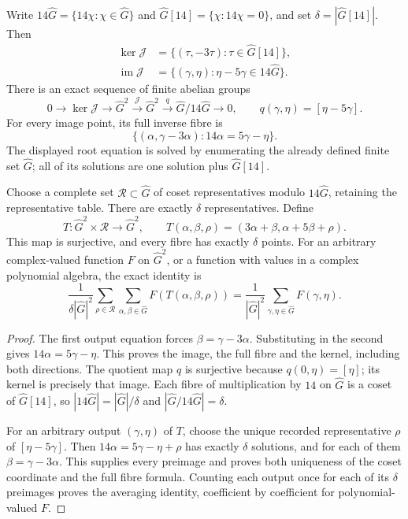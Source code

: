 \begin{theorem}
\label{thm:ns-character-coset-correction}
Write $14\widehat G=\{14\chi:\chi\in\widehat G\}$ and
$\widehat G[14]=\{\chi:14\chi=0\}$, and set
$\delta=|\widehat G[14]|$. Then
\[
 \begin{split}
 \ker\mathcal J&=\{(\tau,-3\tau):\tau\in\widehat G[14]\},\\
 \operatorname{im}\mathcal J
   &=\{(\gamma,\eta):\eta-5\gamma\in14\widehat G\}.
 \end{split}
\]
There is an exact sequence of finite abelian groups
\[
 0\longrightarrow\ker\mathcal J\longrightarrow\widehat G^2
   \xrightarrow{\mathcal J}\widehat G^2
   \xrightarrow{q}\widehat G/14\widehat G\longrightarrow0,
 \qquad q(\gamma,\eta)=[\eta-5\gamma].
\]
For every image point, its full inverse fibre is
\[
 \{(\alpha,\gamma-3\alpha):14\alpha=5\gamma-\eta\}.
\]
The displayed root equation is solved by enumerating the already
defined finite set $\widehat G$; all of its solutions are one
solution plus $\widehat G[14]$.

Choose a complete set $\mathcal R\subset\widehat G$ of coset
representatives modulo $14\widehat G$, retaining the representative
table. There are exactly $\delta$ representatives. Define
\[
 T:\widehat G^2\times\mathcal R\longrightarrow\widehat G^2,
 \qquad T(\alpha,\beta,\rho)
       =(3\alpha+\beta,\alpha+5\beta+\rho).
\]
This map is surjective, and every fibre has exactly $\delta$
points. For an arbitrary complex-valued function $F$ on
$\widehat G^2$, or a function with values in a complex polynomial
algebra, the exact identity is
\[
 \frac1{\delta|\widehat G|^2}
 \sum_{\rho\in\mathcal R}\sum_{\alpha,\beta\in\widehat G}
       F(T(\alpha,\beta,\rho))
 =\frac1{|\widehat G|^2}\sum_{\gamma,\eta\in\widehat G}F(\gamma,\eta).
\]
\end{theorem}
\begin{proof}
The first output equation forces $\beta=\gamma-3\alpha$.
Substituting in the second gives $14\alpha=5\gamma-\eta$.
This proves the image, the full fibre and the kernel, including
both directions. The quotient map $q$ is surjective because
$q(0,\eta)=[\eta]$; its kernel is precisely that image. Each fibre
of multiplication by $14$ on $\widehat G$ is a coset of
$\widehat G[14]$, so $|14\widehat G|=|\widehat G|/\delta$ and
$|\widehat G/14\widehat G|=\delta$.

For an arbitrary output $(\gamma,\eta)$ of $T$, choose the unique
recorded representative $\rho$ of $[\eta-5\gamma]$. Then
$14\alpha=5\gamma-\eta+\rho$ has exactly $\delta$ solutions,
and for each of them $\beta=\gamma-3\alpha$. This supplies every
preimage and proves both uniqueness of the coset coordinate and
the full fibre formula. Counting each output once for each of its
$\delta$ preimages proves the averaging identity, coefficient by
coefficient for polynomial-valued $F$.
\end{proof}

